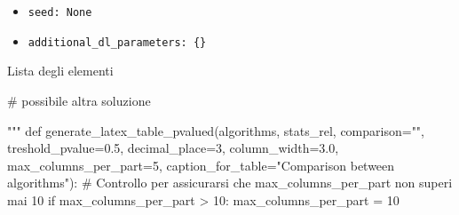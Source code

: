 \begin{itemize}
\begin{table}[htbp]
{\begin{minipage}{\columnwidth}
\begin{itemize}
\begin{minipage}[t]{\linewidth}
  \texttt{embedding\_combiner: \{'Centroid': \{\}\}}
\end{minipage}
\item \begin{minipage}[t]{\linewidth}
  \texttt{seed: None}
\end{minipage}
\item \begin{minipage}[t]{\linewidth}
  \texttt{additional\_dl\_parameters: \{\}}
\end{minipage}
\end{itemize}
\end{minipage}
}
\caption{Lista degli elementi}
\end{table}

# possibile altra soluzione

\begin{table}[htbp]
\end{table}


"""
def generate_latex_table_pvalued(algorithms, stats_rel, comparison="", treshold_pvalue=0.5,
                                 decimal_place=3, column_width=3.0,
                                 max_columns_per_part=5, caption_for_table="Comparison between algorithms"):
    # Controllo per assicurarsi che max_columns_per_part non superi mai 10
    if max_columns_per_part > 10:
        max_columns_per_part = 10


\end{itemize}
